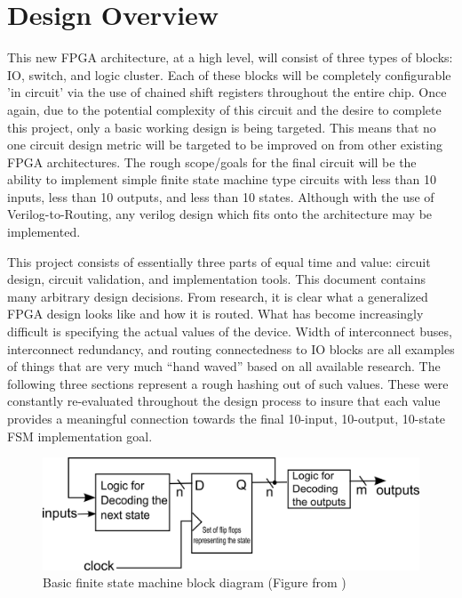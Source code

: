 \documentclass[12pt]{article}
\begin{document}
\newpage
\section{Design Overview}

This new FPGA architecture, at a high level, will consist of three types of blocks:
IO, switch, and logic cluster. Each of these blocks will be completely configurable 'in circuit'
via the use of chained shift registers throughout the entire chip. Once again, due 
to the potential complexity of this circuit and the desire to complete this project,
only a basic working design is being targeted. This means that no one circuit design
metric will be targeted to be improved on from other existing FPGA architectures.
The rough scope/goals for the final circuit will be the ability to implement simple
finite state machine type circuits with less than 10 inputs, less than 10 outputs, and
less than 10 states. Although with the use of Verilog-to-Routing, any verilog design
which fits onto the architecture may be implemented.

This project consists of essentially three parts of equal time and value: circuit 
design, circuit validation, and implementation tools. This document contains many 
arbitrary design decisions. From research, it is clear what a generalized FPGA design 
looks like and how it is routed. What has become increasingly difficult is specifying 
the actual values of the device. Width of interconnect buses, interconnect redundancy,
and routing connectedness to IO blocks are all examples of things that are very 
much “hand waved” based on all available research. The following three 
sections represent a rough hashing out of such values. These were constantly 
re-evaluated throughout the design process to insure that each value provides a meaningful 
connection towards the final 10-input, 10-output, 10-state FSM implementation goal.

\begin{figure}[ht]
  \centering
  \includegraphics[width=.7\textwidth]{fsm}
  \caption{Basic finite state machine block diagram (Figure from \cite{fsm})}
  \label{fig:fsm}
\end{figure}
\end{document}
